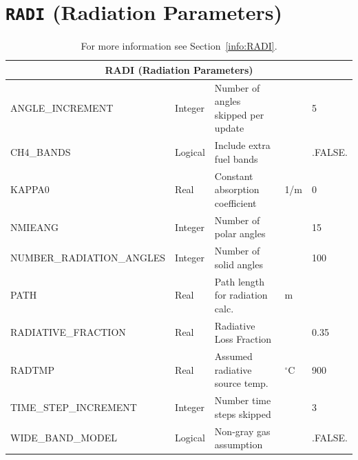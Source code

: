 \documentclass[11pt]{book}
\begin{document}
\section{\texorpdfstring{{\tt RADI}}{RADI} (Radiation Parameters)}

\hspace{1in}

\begin{table}[H]
\caption{For more information see Section~\ref{info:RADI}.}\label{tbl:RADI}
\noindent
\begin{tabular*}{\textwidth}{@{\extracolsep{\fill}}|l|l|l|l|l|}
\hline
\multicolumn{5}{|c|}{{\ct RADI} (Radiation Parameters)} \\ \hline \hline
{\ct ANGLE\_INCREMENT}          & Integer  & Number of angles skipped per update &                   & 5    \\ \hline
{\ct CH4\_BANDS          }      & Logical  & Include extra fuel bands            &                   & {\ct .FALSE.} \\ \hline
{\ct KAPPA0                   } & Real     & Constant absorption coefficient     & 1/m               & 0      \\ \hline
{\ct NMIEANG                  } & Integer  & Number of polar angles              &                   & 15     \\ \hline
{\ct NUMBER\_RADIATION\_ANGLES} & Integer  & Number of solid angles              &                   & 100    \\ \hline
{\ct PATH                     } & Real     & Path length for radiation calc.     &   m               &        \\ \hline
{\ct RADIATIVE\_FRACTION}       & Real     & Radiative Loss Fraction             &                   & 0.35    \\ \hline
{\ct RADTMP                   } & Real     & Assumed radiative source temp.      & $^\circ$C         & 900    \\ \hline
{\ct TIME\_STEP\_INCREMENT}     & Integer  & Number time steps skipped           &                   & 3    \\ \hline
{\ct WIDE\_BAND\_MODEL    }     & Logical  & Non-gray gas assumption             &                   & {\ct .FALSE.} \\ \hline
\end{tabular*}
\end{table}

\vspace{\baselineskip}

\vfill
\end{document}
